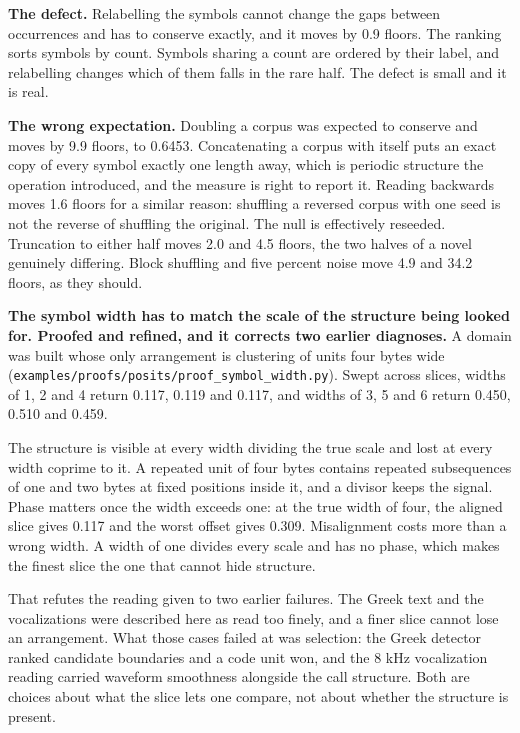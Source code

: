 \textbf{The defect.} Relabelling the symbols cannot change the gaps between occurrences and has to conserve exactly, and it moves by 0.9 floors. The ranking sorts symbols by count. Symbols sharing a count are ordered by their label, and relabelling changes which of them falls in the rare half. The defect is small and it is real.

\textbf{The wrong expectation.} Doubling a corpus was expected to conserve and moves by 9.9 floors, to 0.6453. Concatenating a corpus with itself puts an exact copy of every symbol exactly one length away, which is periodic structure the operation introduced, and the measure is right to report it. Reading backwards moves 1.6 floors for a similar reason: shuffling a reversed corpus with one seed is not the reverse of shuffling the original. The null is effectively reseeded. Truncation to either half moves 2.0 and 4.5 floors, the two halves of a novel genuinely differing. Block shuffling and five percent noise move 4.9 and 34.2 floors, as they should.

\textbf{The symbol width has to match the scale of the structure being looked for. Proofed and refined, and it corrects two earlier diagnoses.} A domain was built whose only arrangement is clustering of units four bytes wide (\texttt{examples/\allowbreak{}proofs/\allowbreak{}posits/\allowbreak{}proof\_\allowbreak{}symbol\_\allowbreak{}width.\allowbreak{}py}). Swept across slices, widths of 1, 2 and 4 return 0.117, 0.119 and 0.117, and widths of 3, 5 and 6 return 0.450, 0.510 and 0.459.

The structure is visible at every width dividing the true scale and lost at every width coprime to it. A repeated unit of four bytes contains repeated subsequences of one and two bytes at fixed positions inside it, and a divisor keeps the signal. Phase matters once the width exceeds one: at the true width of four, the aligned slice gives 0.117 and the worst offset gives 0.309. Misalignment costs more than a wrong width. A width of one divides every scale and has no phase, which makes the finest slice the one that cannot hide structure.

That refutes the reading given to two earlier failures. The Greek text and the vocalizations were described here as read too finely, and a finer slice cannot lose an arrangement. What those cases failed at was selection: the Greek detector ranked candidate boundaries and a code unit won, and the 8 kHz vocalization reading carried waveform smoothness alongside the call structure. Both are choices about what the slice lets one compare, not about whether the structure is present.

